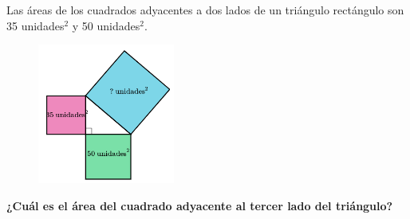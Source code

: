 Las áreas de los cuadrados adyacentes a dos lados de un triángulo
rectángulo son 35 unidades$^2$ y 50 unidades$^2$.
\begin{figure}[H]
    \begin{center}
        \includegraphics[width=0.4\textwidth]{../images/area4.png}
    \end{center}
    \caption{}
    \label{fig:area4}
\end{figure}
\textbf{¿Cuál es el área del cuadrado adyacente al tercer lado del triángulo?}